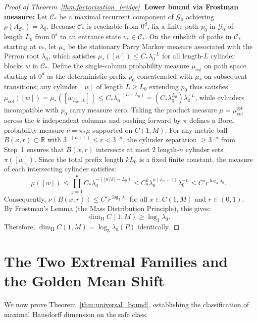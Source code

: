 \documentclass[11pt,reqno]{amsart}
\theoremstyle{plain}
\theoremstyle{definition}
\theoremstyle{remark}
\newcommand{\R}{\mathbb{R}}
\newcommand{\dimH}{\dim_{\mathrm{H}}}
\begin{document}
\begin{proof}[Proof of Theorem~\ref{thm:factorization_bridge}]
\textbf{Lower bound via Frostman measure:}
Let $\mathcal{C}_*$ be a maximal recurrent component of $\mathcal{G}_0$ achieving $\rho(A_{\mathcal{C}_*}) = \lambda_0$. Because $\mathcal{C}_*$ is reachable from $0^d$, fix a finite path $p_0$ in $\mathcal{G}_0$ of length $L_0$ from $0^d$ to an entrance state $v_* \in \mathcal{C}_*$.
On the subshift of paths in $\mathcal{C}_*$ starting at $v_*$, let $\mu_*$ be the stationary Parry Markov measure associated with the Perron root $\lambda_0$, which satisfies $\mu_*([w]) \le C_* \lambda_0^{-L}$ for all length-$L$ cylinder blocks $w$ in $\mathcal{C}_*$.
Define the single-column probability measure $\mu_{\mathrm{col}}$ on path space starting at $0^d$ as the deterministic prefix $p_0$ concatenated with $\mu_*$ on subsequent transitions; any cylinder $[w]$ of length $L \ge L_0$ extending $p_0$ thus satisfies $\mu_{\mathrm{col}}([w]) = \mu_*([w_{L_0 \dots L}]) \le C_* \lambda_0^{-(L - L_0)} = (C_* \lambda_0^{L_0}) \lambda_0^{-L}$, while cylinders incompatible with $p_0$ carry measure zero.
Taking the product measure $\mu = \mu_{\mathrm{col}}^{\otimes k}$ across the $k$ independent columns and pushing forward by $\pi$ defines a Borel probability measure $\nu = \pi_* \mu$ supported on $C(1, M)$.
For any metric ball $B(x, r) \subset \R$ with $3^{-(n+1)} \le r < 3^{-n}$, the cylinder separation $\ge 3^{-n}$ from Step~1 ensures that $B(x, r)$ intersects at most $2$ length-$n$ cylinder sets $\pi([w])$. Since the total prefix length $k L_0$ is a fixed finite constant, the measure of each intersecting cylinder satisfies:
\begin{equation}
\mu([w]) \le \prod_{j=1}^k C_* \lambda_0^{-(\lfloor n/k \rfloor - L_0)} \le C_*^k \lambda_0^{k (L_0 + 1)} \lambda_0^{-n} \le C' r^{\log_3 \lambda_0}.
\end{equation}
Consequently, $\nu(B(x, r)) \le C' r^{\log_3 \lambda_0}$ for all $x \in C(1, M)$ and $r \in (0, 1)$. By Frostman's Lemma (the Mass Distribution Principle), this gives:
\begin{equation}
\dimH C(1, M) \ge \log_3 \lambda_0.
\end{equation}
Therefore, $\dimH C(1, M) = \log_3 \lambda_0(P)$ identically.
\end{proof}

\section{The Two Extremal Families and the Golden Mean Shift}

We now prove Theorem~\ref{thm:universal_bound}, establishing the classification of maximal Hausdorff dimension on the safe class.
\end{document}
